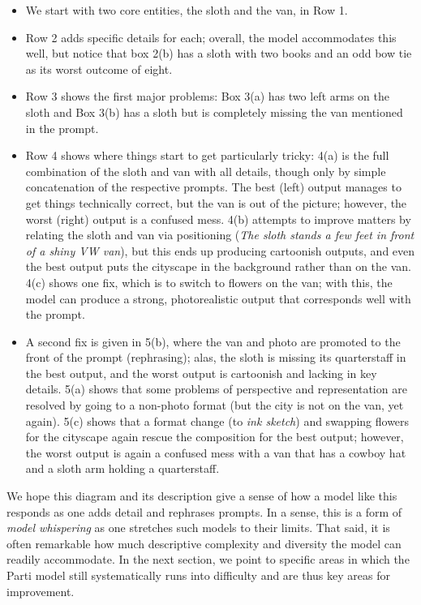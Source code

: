 \begin{itemize}
    \item We start with two core entities, the sloth and the van, in Row 1. 
    \item Row 2 adds specific details for each; overall, the model accommodates this well, but notice that box 2(b) has a sloth with two books and an odd bow tie as its worst outcome of eight.
    \item Row 3 shows the first major problems: Box 3(a) has two left arms on the sloth and Box 3(b) has a sloth but is completely missing the van mentioned in the prompt.
    \item Row 4 shows where things start to get particularly tricky: 4(a) is the full combination of the sloth and van with all details, though only by simple concatenation of the respective prompts. The best (left) output manages to get things technically correct, but the van is out of the picture; however, the worst (right) output is a confused mess. 4(b) attempts to improve matters by relating the sloth and van via positioning (\textit{The sloth stands a few feet in front of a shiny VW van}), but this ends up producing cartoonish outputs, and even the best output puts the cityscape in the background rather than on the van. 4(c) shows one fix, which is to switch to flowers on the van; with this, the model can produce a strong, photorealistic output that corresponds well with the prompt.
    \item A second fix is given in 5(b), where the van and photo are promoted to the front of the prompt (rephrasing); alas, the sloth is missing its quarterstaff in the best output, and the worst output is cartoonish and lacking in key details. 5(a) shows that some problems of perspective and representation are resolved by going to a non-photo format (but the city is not on the van, yet again). 5(c) shows that a format change (to \textit{ink sketch}) and swapping flowers for the cityscape again rescue the composition for the best output; however, the worst output is again a confused mess with a van that has a cowboy hat and a sloth arm holding a quarterstaff. 
\end{itemize}

We hope this diagram and its description give a sense of how a model like this responds as one adds detail and rephrases prompts. In a sense, this is a form of \textit{model whispering} as one stretches such models to their limits. That said, it is often remarkable how much descriptive complexity and diversity the model can readily accommodate. In the next section, we point to specific areas in which the Parti model still systematically runs into difficulty and are thus key areas for improvement.

